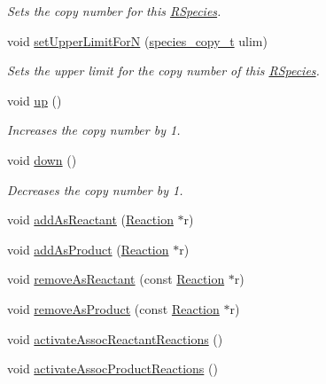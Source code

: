 \begin{DoxyCompactItemize}
\begin{DoxyCompactList}\small\item\em Sets the copy number for this \hyperlink{classchem_1_1RSpecies}{R\-Species}. \end{DoxyCompactList}\item 
void \hyperlink{classchem_1_1RSpecies_a13c47ccb546b64f83ac09734c286fcd2}{set\-Upper\-Limit\-For\-N} (\hyperlink{common_8h_a3503f321fd36304ee274141275cca586}{species\-\_\-copy\-\_\-t} ulim)
\begin{DoxyCompactList}\small\item\em Sets the upper limit for the copy number of this \hyperlink{classchem_1_1RSpecies}{R\-Species}. \end{DoxyCompactList}\item 
void \hyperlink{classchem_1_1RSpecies_ae721e3c649a12e0a81bc6b77afe23f38}{up} ()
\begin{DoxyCompactList}\small\item\em Increases the copy number by 1. \end{DoxyCompactList}\item 
void \hyperlink{classchem_1_1RSpecies_a0b9db54a1407d689be7477e77b4bb1c6}{down} ()
\begin{DoxyCompactList}\small\item\em Decreases the copy number by 1. \end{DoxyCompactList}\item 
void \hyperlink{classchem_1_1RSpecies_a88c4e30858e503105a3fa39e649060ef}{add\-As\-Reactant} (\hyperlink{classchem_1_1Reaction}{Reaction} $\ast$r)
\item 
void \hyperlink{classchem_1_1RSpecies_ab81e66709c72efa36ee8f29f969dc477}{add\-As\-Product} (\hyperlink{classchem_1_1Reaction}{Reaction} $\ast$r)
\item 
void \hyperlink{classchem_1_1RSpecies_ad0a8e2da5b7a0362b1fb20ad72671005}{remove\-As\-Reactant} (const \hyperlink{classchem_1_1Reaction}{Reaction} $\ast$r)
\item 
void \hyperlink{classchem_1_1RSpecies_a423e5852f749ab65553c48ed0239c243}{remove\-As\-Product} (const \hyperlink{classchem_1_1Reaction}{Reaction} $\ast$r)
\item 
void \hyperlink{classchem_1_1RSpecies_a1589cd0e045a084a32dff4a02612d4a3}{activate\-Assoc\-Reactant\-Reactions} ()
\item 
void \hyperlink{classchem_1_1RSpecies_ab275b0c9fb9352abe35a3bd68f3917fb}{activate\-Assoc\-Product\-Reactions} ()
\item 

\end{DoxyCompactItemize}
